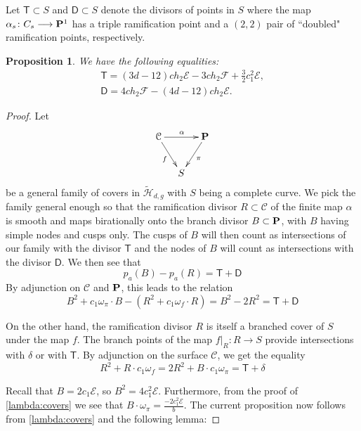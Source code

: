 \documentclass[reqno, 10 pt]{article}
\newtheorem{prop}[thm]{Proposition}
\theoremstyle{definition}
\theoremstyle{remark}
\numberwithin{equation}{section}
\numberwithin{thm}{section}
\numberwithin{prop}{section}
\numberwithin{lem}{section}
\numberwithin{cor}{section}
\numberwithin{conj}{section}
\numberwithin{defn}{section}
\renewcommand{\H}{\mathcal H}
\renewcommand{\to}{\longrightarrow}
\newcommand{\sfT}{{\mathsf T}}
\newcommand{\sfD}{{\mathsf D}}
\newcommand{\cC}{{\mathcal C}}
\newcommand{\cE}{{\mathcal E}}
\newcommand{\cF}{{\mathcal F}}
\renewcommand{\P}{{\bf P}}
\newcommand {\from}{{\colon}}
\renewcommand{\H}{{\mathcal{H}}}
\begin{document}
 



Let $\sfT \subset S$ and $\sfD \subset S$ denote the divisors of points in $S$ where the map $\alpha_{s} \from C_{s} \to \P^1$ has a triple ramification point and a $(2,2)$ pair of ``doubled" ramification points, respectively.  

\begin{prop}\label{classTD}
We have the following equalities: 
\begin{align}
&\sfT = (3d-12)ch_{2}\cE - 3ch_{2}\cF + \frac{3}{2}c_{1}^{2}\cE,&\\
&\sfD = 4ch_{2}\cF - (4d-12)ch_{2}\cE.&
\end{align}
\end{prop}
\begin{proof}
 Let 
 \begin{equation} 
\xymatrix @C -1.1pc  {
\cC \ar[rr]^{\alpha} \ar[rd]_f&&
\P \ar[ld]^{\pi} \\
& S}
 \end{equation} 
 be a general family of covers in $\widetilde{\H}_{d,g}$ with $S$ being a complete curve. We pick the family general enough so that the ramification divisor $R \subset \cC$ of the finite map $\alpha$ is smooth and maps birationally onto the branch divisor $B \subset \P$, with $B$ having simple nodes and cusps only.  The cusps of $B$ will then count as intersections of our family with the divisor $\sfT$ and the nodes of $B$ will count as intersections with the divisor $\sfD$.  We then see that 
 \begin{equation}\label{comparegenera}
 p_{a}(B) - p_{a}(R) = \sfT + \sfD
 \end{equation}
 By adjunction on $\cC$ and $\P$, this leads to the relation 
 \begin{equation}\label{T+D}
 B^{2} + c_{1}\omega_{\pi}\cdot B - (R^{2} + c_{1}\omega_{f}\cdot R) = B^{2} - 2R^{2} = \sfT + \sfD
 \end{equation}
 
 On the other hand, the ramification divisor $R$ is itself a branched cover of $S$ under the map $f$.  The branch points of the map $f|_{R} \from R \to S$ provide intersections with $\delta$ or with $\sfT$. By adjunction on the surface $\cC$, we get the equality 
 \begin{equation}
 R^{2} + R \cdot c_{1}\omega_{f}  = 2R^{2} + B \cdot c_{1}\omega_{\pi}= \sfT + \delta
 \end{equation}

Recall that $B = 2c_{1}\cE$, so $B^{2} = 4c_{1}^{2}\cE$.  Furthermore, from the proof of \autoref{lambda:covers} we see that $B \cdot \omega_{\pi} = \frac{-2c_{1}^{2}\cE}{b}$.  The current proposition now follows from \autoref{lambda:covers} and the following lemma: 


\end{proof}
\end{document}
